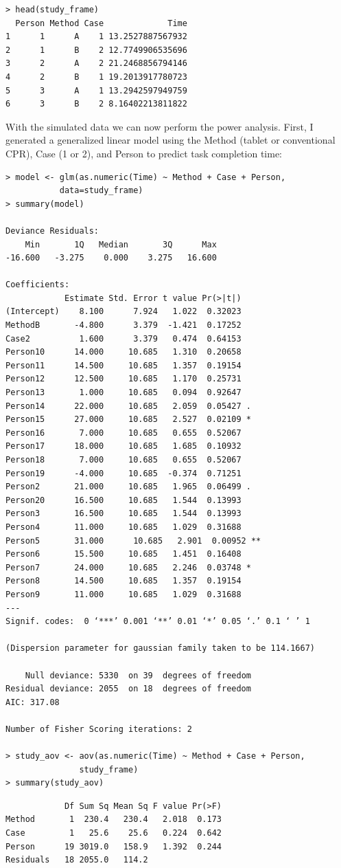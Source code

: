 \documentclass[11pt]{article}
\begin{document}
\begin{center}
\begin{verbatim}
> head(study_frame)
  Person Method Case             Time
1      1      A    1 13.2527887567932
2      1      B    2 12.7749906535696
3      2      A    2 21.2468856794146
4      2      B    1 19.2013917780723
5      3      A    1 13.2942597949759
6      3      B    2 8.16402213811822
\end{verbatim}
\end{center}
\noindent With the simulated data we can now perform the power analysis. First, I generated a generalized linear model using the Method (tablet or conventional CPR), Case (1 or 2), and Person to predict task completion time: 
\begin{verbatim}> model <- glm(as.numeric(Time) ~ Method + Case + Person, 
           data=study_frame)
> summary(model)

Deviance Residuals: 
    Min       1Q   Median       3Q      Max  
-16.600   -3.275    0.000    3.275   16.600  

Coefficients:
            Estimate Std. Error t value Pr(>|t|)   
(Intercept)    8.100      7.924   1.022  0.32023   
MethodB       -4.800      3.379  -1.421  0.17252   
Case2          1.600      3.379   0.474  0.64153   
Person10      14.000     10.685   1.310  0.20658   
Person11      14.500     10.685   1.357  0.19154   
Person12      12.500     10.685   1.170  0.25731   
Person13       1.000     10.685   0.094  0.92647   
Person14      22.000     10.685   2.059  0.05427 . 
Person15      27.000     10.685   2.527  0.02109 * 
Person16       7.000     10.685   0.655  0.52067   
Person17      18.000     10.685   1.685  0.10932   
Person18       7.000     10.685   0.655  0.52067   
Person19      -4.000     10.685  -0.374  0.71251   
Person2       21.000     10.685   1.965  0.06499 . 
Person20      16.500     10.685   1.544  0.13993   
Person3       16.500     10.685   1.544  0.13993   
Person4       11.000     10.685   1.029  0.31688   
Person5       31.000      10.685   2.901  0.00952 **
Person6       15.500     10.685   1.451  0.16408   
Person7       24.000     10.685   2.246  0.03748 * 
Person8       14.500     10.685   1.357  0.19154   
Person9       11.000     10.685   1.029  0.31688   
---
Signif. codes:  0 ‘***’ 0.001 ‘**’ 0.01 ‘*’ 0.05 ‘.’ 0.1 ‘ ’ 1 

(Dispersion parameter for gaussian family taken to be 114.1667)

    Null deviance: 5330  on 39  degrees of freedom
Residual deviance: 2055  on 18  degrees of freedom
AIC: 317.08

Number of Fisher Scoring iterations: 2

> study_aov <- aov(as.numeric(Time) ~ Method + Case + Person, 
               study_frame)
> summary(study_aov)
\end{verbatim}
\newpage
\begin{verbatim}
            Df Sum Sq Mean Sq F value Pr(>F)
Method       1  230.4   230.4   2.018  0.173
Case         1   25.6    25.6   0.224  0.642
Person      19 3019.0   158.9   1.392  0.244
Residuals   18 2055.0   114.2      
\end{verbatim}
\end{document}
